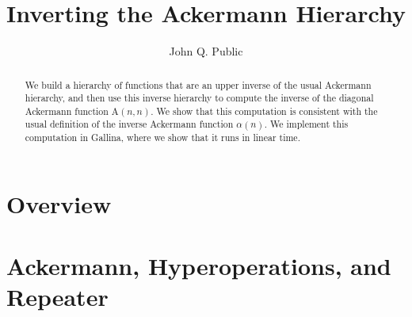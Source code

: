 \documentclass[a4paper,USenglish,cleveref, autoref]{lipics-v2019}
\title{Inverting the Ackermann Hierarchy}
\author{John Q. Public}{Dummy University Computing Laboratory, Country}{}{}{}%
\newcommand{\Ack}{\ensuremath{\text{A}}}
\theoremstyle{plain}
\theoremstyle{definition}
\begin{document}
\maketitle







\begin{abstract}
We build a hierarchy of functions that are an upper inverse
of the usual Ackermann hierarchy, and then use this inverse
hierarchy to compute the inverse of the diagonal Ackermann
function $\Ack(n, n)$. We show that this computation is
consistent with the usual definition of the inverse Ackermann
function $\alpha(n)$. We implement this computation in Gallina,
where we show that it runs in linear time.
\end{abstract}




\section{Overview}
\label{sec: overview}


\section{Ackermann, Hyperoperations, and Repeater}
\label{sec: countdown-repeater}

\end{document}
